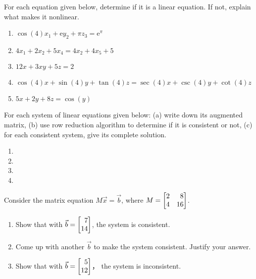 \begin{exercises}
	\begin{problist}
		\prob For each equation given below, determine if it is a linear
		equation. If not, explain what makes it nonlinear.
		\begin{enumerate}
			\item $\cos(4)x_{1}+\mathrm{e}y_{2}+\pi z_{3}=\mathrm{e}^{\pi}$

			\item $4x_{1}+2x_{2}+5x_{4}=4x_{2}+4x_{5}+5$

			\item $12x+3xy+5z=2$

			\item $\cos(4)x+\sin(4)y+\tan(4)z=\sec(4)x+\csc(4)y+\cot(4)z$

			\item $5x+2y+8z=\cos(y)$
		\end{enumerate}

		\prob For each system of linear equations given below: (a) write down its
		augmented matrix, (b) use row reduction algorithm to determine if it is
		consistent or not, (c) for each consistent system, give its complete
		solution.
		\begin{enumerate}
			\item {}

			\item {}

			\item {}

			\item {}
		\end{enumerate}

		\prob Consider the matrix equation $M\vec x=\vec b$, where $M=\mat{2 & 8 \\ 4 & 16}$.
		\begin{enumerate}
			\item Show that with $\vec b=\mat{7 \\ 14}$, the system is
				consistent.

			\item Come up with another $\vec b$ to make the system consistent.
				Justify your answer.

			\item Show that with $\vec b=\mat{5 \\ 12}$， the system is
				inconsistent.


\end{enumerate}
\end{problist}
\end{exercises}
